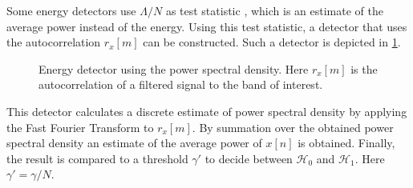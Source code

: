 \documentclass[a4paper, openany, oneside]{memoir}
\begin{document}
Some energy detectors use $\Lambda/N$ as test statistic \cite{chang2008sensing}, which is an estimate of the average power instead of the energy. Using this test statistic, a detector that uses the autocorrelation $r_x[m]$ can be constructed. Such a detector is depicted in \cref{tkz:ed_psd}.
\begin{figure}[H]
\centering
{}
\caption{Energy detector using the power spectral density. Here $r_x[m]$ is the autocorrelation of a filtered signal to the band of interest.}
\label{tkz:ed_psd}
\end{figure}
This detector calculates a discrete estimate of power spectral density by applying the Fast Fourier Transform to $r_x[m]$. By summation over the obtained power spectral density an estimate of the average power of $x[n]$ is obtained. Finally, the result is compared to a threshold $\gamma'$  to decide between $\mathcal{H}_0$ and $\mathcal{H}_1$. Here $\gamma'=\gamma/N$.
\end{document}
